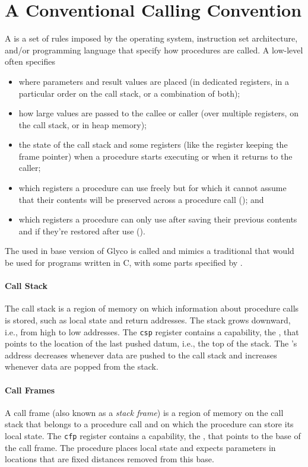 \documentclass[main.tex]{subfiles}
\begin{document}
\section{A Conventional Calling Convention}
A  is a set of rules imposed by the operating system, instruction set architecture, and/or programming language that specify how procedures are called. A low-level  often specifies
\begin{itemize}[noitemsep]
	\item where parameters and result values are placed (in dedicated registers, in a particular order on the call stack, or a combination of both);
	\item how large values are passed to the callee or caller (over multiple registers, on the call stack, or in heap memory);
	\item the state of the call stack and some registers (like the register keeping the frame pointer) when a procedure starts executing or when it returns to the caller;
	\item which registers a procedure can use freely but for which it cannot assume that their contents will be preserved across a procedure call (); and
	\item which registers a procedure can only use after saving their previous contents and if they're restored after use ().
\end{itemize}

The  used in base version of Glyco is called \textbf{} and mimics a traditional  that would be used for programs written in C, with some parts specified by \cite[chapter~25]{riscv}.

\paragraph{Call Stack} The call stack is a region of memory on which information about procedure calls is stored, such as local state and return addresses. The stack grows downward, i.e., from high to low addresses. The \texttt{csp} register contains a capability, the \textbf{}, that points to the location of the last pushed datum, i.e., the top of the stack. The 's address decreases whenever data are pushed to the call stack and increases whenever data are popped from the stack.

\paragraph{Call Frames} A call frame (also known as a \emph{stack frame}) is a region of memory on the call stack that belongs to a procedure call and on which the procedure can store its local state. The \texttt{cfp} register contains a capability, the \textbf{}, that points to the base of the call frame. The procedure places local state and expects parameters in locations that are fixed distances removed from this base.
\end{document}
